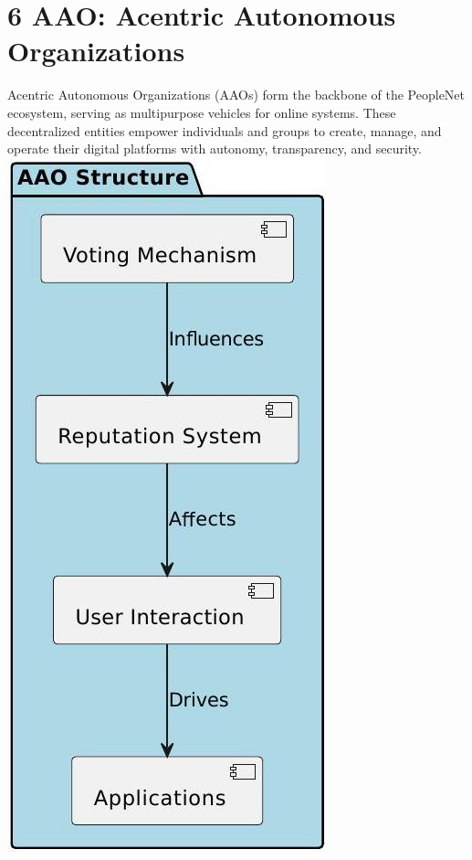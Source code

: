 \documentclass[10pt]{article}
\begin{document}
\section*{6 AAO: Acentric Autonomous Organizations}
Acentric Autonomous Organizations (AAOs) form the backbone of the PeopleNet ecosystem, serving as multipurpose vehicles for online systems. These decentralized entities empower individuals and groups to create, manage, and operate their digital platforms with autonomy, transparency, and security.\\
\includegraphics[max width=\textwidth, center]{2025_03_06_545dea0014012947d15fg-05}
\end{document}
